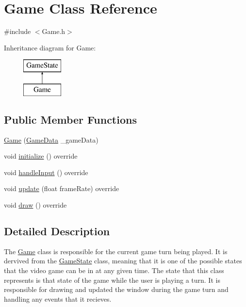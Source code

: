 \hypertarget{class_game}{}\section{Game Class Reference}
\label{class_game}


{\ttfamily \#include $<$Game.\+h$>$}

Inheritance diagram for Game\+:\begin{figure}[H]
\begin{center}
\leavevmode
\includegraphics[height=2.000000cm]{class_game}
\end{center}
\end{figure}
\subsection*{Public Member Functions}
\begin{DoxyCompactItemize}
\item 
\mbox{\hyperlink{class_game_a57536075cd1bb2ffd645ff05bd1ff9b8}{Game}} (\mbox{\hyperlink{_engine_8h_a5bbe002e9f7f45a67e8fda9dbe980a3f}{Game\+Data}} \+\_\+game\+Data)
\item 
void \mbox{\hyperlink{class_game_ae2cce13c2c6358709513a06932df939a}{initialize}} () override
\item 
void \mbox{\hyperlink{class_game_a59b929e54a2879beab72fc6ce724c313}{handle\+Input}} () override
\item 
void \mbox{\hyperlink{class_game_a5470c86c0d379e7cb50175b5079fd559}{update}} (float frame\+Rate) override
\item 
void \mbox{\hyperlink{class_game_a9dbbb6429980a91196ed07d299404304}{draw}} () override
\end{DoxyCompactItemize}


\subsection{Detailed Description}
The \mbox{\hyperlink{class_game}{Game}} class is responsible for the current game turn being played. It is dervived from the \mbox{\hyperlink{class_game_state}{Game\+State}} class, meaning that it is one of the possible states that the video game can be in at any given time. The state that this class represents is that state of the game while the user is playing a turn. It is responsible for drawing and updated the window during the game turn and handling any events that it recieves. 

